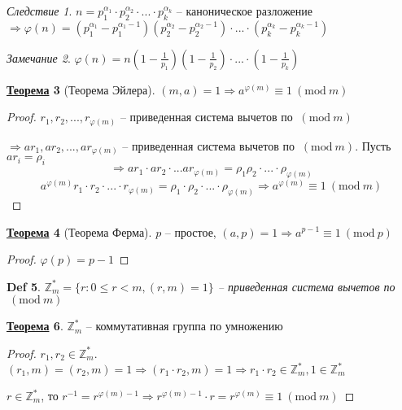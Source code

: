 \documentclass[12pt]{article}
\def\Z{\mathbb{Z}}       %
\def\SO{\Rightarrow}     %
\theoremstyle{definition} %
\newtheorem{Thm}{\underline{Теорема}}[subsection] %
\theoremstyle{plain} %
\newtheorem{Def}[Thm]{Def} %
\theoremstyle{remark} %
\newtheorem{Cons}[Thm]{Следствие} %
\newtheorem{Rem}[Thm]{Замечание} %
\newcommand{\Mod}[1]{\ (\mathrm{mod}\ #1)}
\begin{document}
{\begin{Cons}
    $n = p_1^{\alpha_1} \cdot p_2^{\alpha_2} \cdot ... \cdot p_k^{\alpha_k}$ -- каноническое разложение
    $\SO \varphi(n) = (p_1^{\alpha_1} - p_1^{\alpha_1 - 1})(p_2^{\alpha_2} - p_2^{\alpha_2 - 1}) \cdot ... \cdot (p_k^{\alpha_k} - p_k^{\alpha_k - 1})$  
\end{Cons}

\begin{Rem}
    $\varphi(n) = n(1 - \frac{1}{p_1})(1 - \frac{1}{p_2}) \cdot ... \cdot (1 - \frac{1}{p_k})$ 
\end{Rem}

\begin{Thm}[Теорема Эйлера]
    $(m, a) = 1 \SO a^{\varphi(m)} \equiv 1 \Mod m$ 
\end{Thm}

\begin{proof}
    $r_1, r_2, ..., r_{\varphi(m)}$ -- приведенная система вычетов по $\Mod m$
    
    $\SO ar_1, ar_2, ..., ar_{\varphi(m)}$ -- приведенная система вычетов по $\Mod m$. Пусть $ar_i = \rho_i$
    \[\SO ar_1 \cdot ar_2 \cdot ... ar_{\varphi(m)} = \rho_1 \rho_2 \cdot ... \cdot \rho_{\varphi(m)}\]
    \[a^{\varphi(m)} r_1 \cdot r_2 \cdot ... \cdot r_{\varphi(m)} = \rho_1 \cdot \rho_2 \cdot ... \cdot \rho_{\varphi(m)} \SO a^{\varphi(m)} \equiv 1 \Mod m\]   
\end{proof}

\begin{Thm}[Теорема Ферма]
    $p$ -- простое, $(a, p) = 1 \SO a^{p - 1} \equiv 1 \Mod p$ 
\end{Thm}

\begin{proof}
    $\varphi(p) = p - 1$ 
\end{proof}

\begin{Def}
    $\Z_m^* = \{r : 0 \leqslant r < m, (r, m) = 1\}$ -- приведенная система вычетов по $\Mod m$ 
\end{Def}

\begin{Thm}
    $\Z_m^*$ -- коммутативная группа по умножению
\end{Thm}

\begin{proof}
    $r_1, r_2 \in \Z_m^*$. $(r_1, m) = (r_2, m) = 1 \SO (r_1 \cdot r_2, m) = 1 \SO r_1 \cdot r_2 \in \Z_m^*, 1 \in \Z_m^*$
    
    $r \in \Z_m^*$, то $r^{-1} = r^{\varphi(m) - 1} \SO r^{\varphi(m) - 1} \cdot r = r^{\varphi(m)} \equiv 1 \Mod m$  
\end{proof}

}
\end{document}
